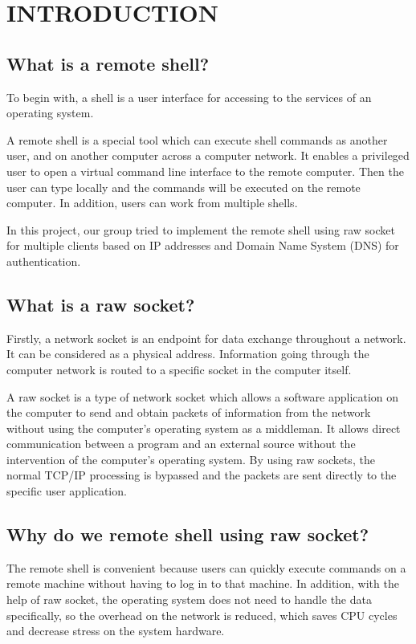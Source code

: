 \newpage
\vspace{6cm}
\section{INTRODUCTION}
\subsection{What is a remote shell?}
\hspace{0.7cm}To begin with, a shell is a user interface for accessing to the services of an operating system.

\vspace{0.5cm}A remote shell is a special tool which can execute shell commands as another user, and on another computer across a computer network. It enables a privileged user to open a virtual command line interface to the remote computer. Then the user can type locally and the commands will be executed on the remote computer. In addition, users can work from multiple shells.

\vspace{0.5cm}In this project, our group tried to implement the remote shell using raw socket for multiple clients based on IP addresses and Domain Name System (DNS) for authentication. 

\subsection{What is a raw socket?}
\hspace{0.7cm}Firstly, a network socket is an endpoint for data exchange throughout a network. It can be considered as a physical address. Information going through the computer network is routed to a specific socket in the computer itself.

\vspace{0.7cm}A raw socket is a type of network socket which allows a software application on the computer to send and obtain packets of information from the network without using the computer’s operating system as a middleman. It allows direct communication between a program and an external source without the intervention of the computer’s operating system. By using raw sockets, the normal TCP/IP processing is bypassed and the packets are sent directly to the specific user application.  

\subsection{Why do we remote shell using raw socket?}
\hspace{0.7cm}The remote shell is convenient because users can quickly execute commands on a remote machine without having to log in to that machine. In addition, with the help of raw socket, the operating system does not need to handle the data specifically, so the overhead on the network is reduced, which saves CPU cycles and decrease stress on the system hardware.